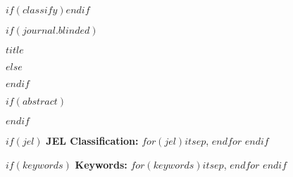 \def\spacingset#1{\renewcommand{\baselinestretch}%
{#1}\small\normalsize} \spacingset{1}

$if(classify)$$endif$

$if(journal.blinded)$
  \spacingset{.8}
  \bigskip
  \bigskip
  \bigskip
  \begin{center}
    {\LARGE\textbf{$title$}}
  \end{center}
  \smallskip
  \bigskip
  \spacingset{1}
$else$
  \maketitle
$endif$

\bigskip

$if(abstract)$
\begin{abstract}
$abstract$
\end{abstract}
$endif$

\medskip

$if(jel)$
\noindent\textbf{JEL Classification:} $for(jel)$$it$$sep$, $endfor$
$endif$

$if(keywords)$
\noindent\textbf{Keywords:} $for(keywords)$$it$$sep$, $endfor$
$endif$

\vfill
\clearpage

\spacingset{1.9} %
\parindent=20pt
\parskip=0pt
\setlength{\topsep}{0pt}

\captionsetup[subtable]{skip=0pt}

